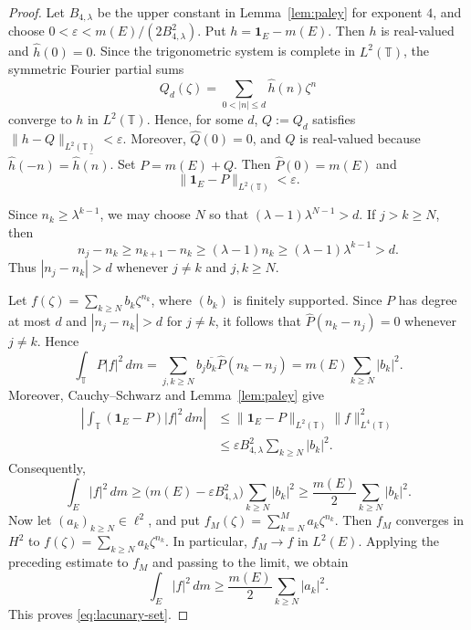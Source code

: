 \documentclass[10pt,a4paper]{amsart}
\newcommand{\T}{\mathbb{T}}
\begin{document}
\begin{proof}
Let \(B_{4,\lambda}\) be the upper constant in
Lemma~\ref{lem:paley} for exponent \(4\), and choose
\(0<\varepsilon<m(E)/(2B_{4,\lambda}^2)\). Put \(h=\mathbf1_E-m(E)\). Then \(h\) is real-valued and
\(\widehat h(0)=0\). Since the trigonometric system is complete in
\(L^2(\T)\), the symmetric Fourier partial sums
\[
        Q_d(\zeta)
        =
        \sum_{0<|n|\le d}\widehat h(n)\zeta^n
\]
converge to \(h\) in \(L^2(\T)\). Hence, for some \(d\), \(Q:=Q_d\)
satisfies
\(\|h-Q\|_{L^2(\T)}<\varepsilon\). Moreover,
\(\widehat Q(0)=0\), and \(Q\) is real-valued because
\(\widehat h(-n)=\overline{\widehat h(n)}\). Set
\(P=m(E)+Q\). Then \(\widehat P(0)=m(E)\) and
\[\|\mathbf1_E-P\|_{L^2(\T)}<\varepsilon.\]

Since \(n_k\ge\lambda^{k-1}\), we may choose \(N\) so that
\((\lambda-1)\lambda^{N-1}>d\). If \(j>k\ge N\), then
\[
        n_j-n_k
        \ge
        n_{k+1}-n_k
        \ge
        (\lambda-1)n_k
        \ge
        (\lambda-1)\lambda^{k-1}
        >
        d.
\]
Thus \(|n_j-n_k|>d\) whenever \(j\ne k\) and \(j,k\ge N\).

Let \(f(\zeta)=\sum\limits_{k\ge N}b_k\zeta^{n_k}\), where \((b_k)\) is
finitely supported. Since \(P\) has degree at most \(d\) and
\(|n_j-n_k|>d\) for \(j\ne k\), it follows that
\(\widehat P(n_k-n_j)=0\) whenever \(j\ne k\). Hence
\[
        \int_\T P|f|^2\,dm
        =
        \sum_{j,k\ge N}
        b_j\overline{b_k}\widehat P(n_k-n_j)
        =
        m(E)\sum_{k\ge N}|b_k|^2.
\]
Moreover, Cauchy--Schwarz and
Lemma~\ref{lem:paley} give
\[
\begin{aligned}
        \left|
        \int_\T(\mathbf1_E-P)|f|^2\,dm
        \right|
        &\le
        \|\mathbf1_E-P\|_{L^2(\T)}
        \|f\|_{L^4(\T)}^2                                      \\
        &\le
        \varepsilon B_{4,\lambda}^2
        \sum_{k\ge N}|b_k|^2.
\end{aligned}
\]
Consequently,
\[
        \int_E|f|^2\,dm
        \ge
        \bigl(m(E)-\varepsilon B_{4,\lambda}^2\bigr)
        \sum_{k\ge N}|b_k|^2
        \ge
        \frac{m(E)}{2}
        \sum_{k\ge N}|b_k|^2.
\]
Now let \((a_k)_{k\ge N}\in\ell^2\), and put
\(
f_M(\zeta)
=
\sum\limits_{k=N}^M a_k\zeta^{n_k}.
\)
Then \(f_M\) converges in \(H^2\) to
\(
 f(\zeta)
=
\sum\limits_{k\ge N}a_k\zeta^{n_k}.
\)
In particular, \(f_M\to f\) in \(L^2(E)\). Applying the preceding
estimate to \(f_M\) and passing to the limit, we obtain
\[
        \int_E|f|^2\,dm
        \ge
        \frac{m(E)}{2}
        \sum_{k\ge N}|a_k|^2.
\]
This proves \eqref{eq:lacunary-set}.
\end{proof}
\end{document}
